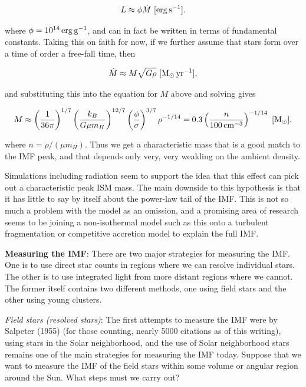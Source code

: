 \documentclass[a4paper,10pt]{article}
\begin{document}
\begin{align*}
    L \approx \phi\dot{M} ~ [{\rm erg\,s^{-1}}].
\end{align*}

{\noindent}where $\phi=10^{14}\,{\rm erg\,g^{-1}}$, and can in fact be written in terms of fundamental constants. Taking this on faith for now, if we further assume that stars form over a time of order a free-fall time, then

\begin{align*}
    \dot{M}\approx M\sqrt{G\rho} ~ [{\rm M_\odot\,yr^{-1}}],
\end{align*}

{\noindent}and substituting this into the equation for $M$ above and solving gives

\begin{align*}
    M\approx \left(\frac{1}{36\pi}\right)^{1/7} \left(\frac{k_B}{G\mu m_H}\right)^{12/7} \left(\frac{\phi}{\sigma}\right)^{3/7} \rho^{-1/14} = 0.3\left(\frac{n}{100\,{\rm cm^{-3}}}\right)^{-1/14} ~ [{\rm M_\odot}],
\end{align*}

{\noindent}where $n=\rho/(\mu m_H)$. Thus we get a characteristic mass that is a good match to the IMF peak, and that depends only very, very weakling on the ambient density.

{\noindent}Simulations including radiation seem to support the idea that this effect can pick out a characteristic peak ISM mass. The main downside to this hypothesis is that it has little to say by itself about the power-law tail of the IMF. This is not so much a problem with the model as an omission, and a promising area of research seems to be joining a non-isothermal model such as this onto a turbulent fragmentation or competitive accretion model to explain the full IMF.

{\noindent}\textbf{Measuring the IMF}: There are two major strategies for measuring the IMF. One is to use direct star counts in regions where we can resolve individual stars. The other is to use integrated light from more distant regions where we cannot. The former itself contains two different methods, one using field stars and the other using young clusters.

{\noindent}\textit{Field stars (resolved stars)}: The first attempts to measure the IMF were by Salpeter (1955) (for those counting, nearly 5000 citations as of this writing), using stars in the Solar neighborhood, and the use of Solar neighborhood stars remains one of the main strategies for measuring the IMF today. Suppose that we want to measure the IMF of the field stars within some volume or angular region around the Sun. What steps must we carry out?
\end{document}
